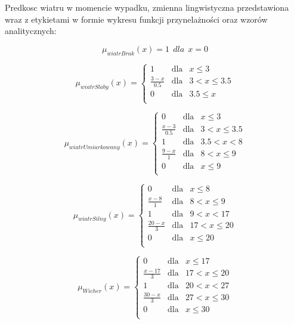 \documentclass{classrep}
\begin{document}
Predkosc wiatru w momencie wypadku, zmienna lingwistyczna przedstawiona wraz z etykietami w formie wykresu funkcji przynelażności oraz wzorów analitycznych:

\begin{equation}
\mu _{wiatrBrak}(x) =   1 \ \ dla \ \ x  = 0
\end{equation}

\begin{equation}
\mu _{wiatrSlaby}(x) =  \left\{ \begin{array}{rcl}
 1 & \mbox{dla} & x  \leq 3 \\
\frac{3- x}{0.5} & \mbox{dla} & 3 < x \leq 3.5\\
0 & \mbox{dla} & 3.5 \leq x\\
\end{array}\right.
\end{equation}

\begin{equation}
\mu _{wiatrUmiarkowany}(x) =  \left\{ \begin{array}{rcl}
 0 & \mbox{dla} & x  \leq 3 \\
\frac{x - 3}{0.5} & \mbox{dla} & 3 < x \leq 3.5\\
1 & \mbox{dla} & 3.5 < x < 8\\
\frac{9 - x}{1} & \mbox{dla} & 8 < x \leq 9\\
 0 & \mbox{dla} & x  \leq 9 \\
\end{array}\right.
\end{equation}

\begin{equation}
\mu _{wiatrSilny}(x) =  \left\{ \begin{array}{rcl}
 0 & \mbox{dla} & x  \leq 8 \\
\frac{x - 8}{1} & \mbox{dla} & 8 < x \leq 9\\
1 & \mbox{dla} & 9 < x < 17\\
\frac{20 - x}{3} & \mbox{dla} & 17 < x \leq 20\\
 0 & \mbox{dla} & x  \leq 20 \\
\end{array}\right.
\end{equation}

\begin{equation}
\mu _{Wicher}(x) =  \left\{ \begin{array}{rcl}
 0 & \mbox{dla} & x  \leq 17 \\
\frac{x - 17}{3} & \mbox{dla} & 17 < x \leq 20\\
1 & \mbox{dla} & 20 < x < 27\\
\frac{30 - x}{3} & \mbox{dla} & 27 < x \leq 30\\
 0 & \mbox{dla} & x  \leq 30 \\
\end{array}\right.
\end{equation}
\end{document}
